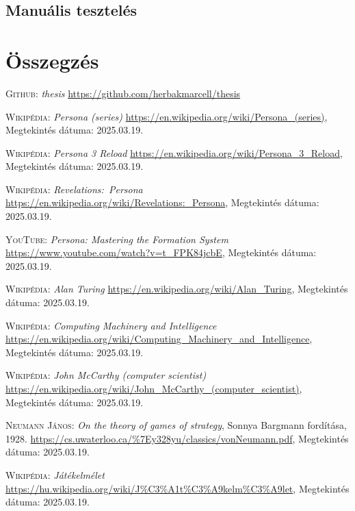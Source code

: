 \documentclass[
]{thesis-ekf}
\theoremstyle{definition}
\theoremstyle{remark}
\begin{document}
\section{Manuális tesztelés}

\chapter*{Összegzés}


\begin{thebibliography}{2}

\textsc{Github:} \emph{thesis} 
\url{https://github.com/herbakmarcell/thesis}

\textsc{Wikipédia:} \emph{Persona (series)} 
\url{https://en.wikipedia.org/wiki/Persona_(series)}, Megtekintés dátuma: 2025.03.19.

\textsc{Wikipédia:} \emph{Persona 3 Reload} 
\url{https://en.wikipedia.org/wiki/Persona_3_Reload}, Megtekintés dátuma: 2025.03.19.

\textsc{Wikipédia:} \emph{Revelations:~Persona} 
\url{https://en.wikipedia.org/wiki/Revelations:_Persona}, Megtekintés dátuma: 2025.03.19.

\textsc{YouTube:} \emph{Persona: Mastering the Formation System} 
\url{https://www.youtube.com/watch?v=t_FPK84jcbE}, Megtekintés dátuma: 2025.03.19.

\textsc{Wikipédia:} \emph{Alan Turing} 
\url{https://en.wikipedia.org/wiki/Alan_Turing}, Megtekintés dátuma: 2025.03.19.

\textsc{Wikipédia:} \emph{Computing Machinery and Intelligence} 
\url{https://en.wikipedia.org/wiki/Computing_Machinery_and_Intelligence}, Megtekintés dátuma: 2025.03.19.

\textsc{Wikipédia:} \emph{John McCarthy (computer scientist)} 
\url{https://en.wikipedia.org/wiki/John_McCarthy_(computer_scientist)}, Megtekintés dátuma: 2025.03.19.

\textsc{Neumann János}: \emph{On the theory of games of strategy}, Sonnya Bargmann fordítása, 1928.
\url{https://cs.uwaterloo.ca/%7Ey328yu/classics/vonNeumann.pdf}, Megtekintés dátuma: 2025.03.19.

\textsc{Wikipédia:} \emph{Játékelmélet} 
\url{https://hu.wikipedia.org/wiki/J%C3%A1t%C3%A9kelm%C3%A9let}, Megtekintés dátuma: 2025.03.19.


\end{thebibliography}
\end{document}

